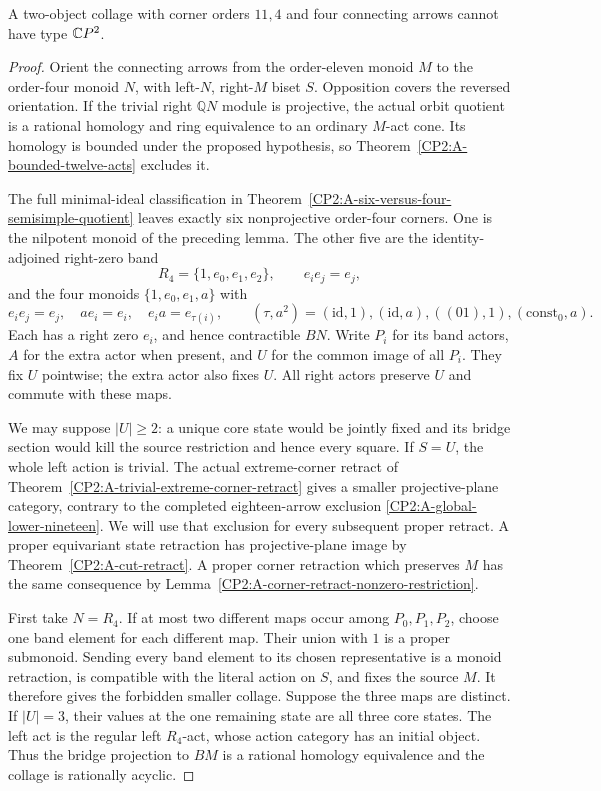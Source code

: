 \begin{proposition}
\label{CP2:A-oriented-nineteen-eleven-four-four}
A two-object collage with corner orders $11,4$ and four
connecting arrows cannot have type $\mathbb{C}P^2$.
\end{proposition}
\begin{proof}
Orient the connecting arrows from the order-eleven monoid
$M$ to the order-four monoid $N$, with left-$N$, right-$M$
biset $S$. Opposition covers the reversed orientation.
If the trivial right $\mathbb QN$ module is projective,
the actual orbit quotient is a rational homology and ring
equivalence to an ordinary $M$-act cone. Its homology is
bounded under the proposed hypothesis, so
Theorem~\ref{CP2:A-bounded-twelve-acts} excludes it.

The full minimal-ideal classification in
Theorem~\ref{CP2:A-six-versus-four-semisimple-quotient}
leaves exactly six nonprojective order-four corners. One
is the nilpotent monoid of the preceding lemma. The other
five are the identity-adjoined right-zero band
\[
 R_4=\{1,e_0,e_1,e_2\},\qquad e_i e_j=e_j,
\]
and the four monoids $\{1,e_0,e_1,a\}$ with
\[
 e_i e_j=e_j,\quad ae_i=e_i,\quad
 e_i a=e_{\tau(i)},\qquad
 (\tau,a^2)=(\mathrm{id},1),(\mathrm{id},a),
 ((01),1),(\mathrm{const}_0,a).
\]
Each has a right zero $e_i$, and hence contractible $BN$.
Write $P_i$ for its band actors, $A$ for the extra actor
when present, and $U$ for the common image of all $P_i$.
They fix $U$ pointwise; the extra actor also fixes $U$.
All right actors preserve $U$ and commute with these maps.

We may suppose $|U|\ge2$: a unique core state would be
jointly fixed and its bridge section would kill the source
restriction and hence every square. If $S=U$, the whole
left action is trivial. The actual extreme-corner retract
of Theorem~\ref{CP2:A-trivial-extreme-corner-retract} gives
a smaller projective-plane category, contrary to the
completed eighteen-arrow exclusion
\ref{CP2:A-global-lower-nineteen}. We will use that exclusion
for every subsequent proper retract. A proper equivariant
state retraction has projective-plane image by
Theorem~\ref{CP2:A-cut-retract}. A proper corner retraction
which preserves $M$ has the same consequence by
Lemma~\ref{CP2:A-corner-retract-nonzero-restriction}.

First take $N=R_4$. If at most two different maps occur
among $P_0,P_1,P_2$, choose one band element for each
different map. Their union with $1$ is a proper submonoid.
Sending every band element to its chosen representative
is a monoid retraction, is compatible with the literal
action on $S$, and fixes the source $M$. It therefore gives
the forbidden smaller collage. Suppose the three maps
are distinct. If $|U|=3$, their values at the one remaining
state are all three core states. The left act is the
regular left $R_4$-act, whose action category has an initial
object. Thus the bridge projection to $BM$ is a rational
homology equivalence and the collage is rationally acyclic.


\end{proof}
